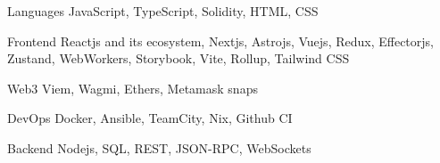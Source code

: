 

\begin{cvskills}

  \cvskill
    {Languages} %
    {JavaScript, TypeScript, Solidity, HTML, CSS} %

  \cvskill
    {Frontend} %
    {Reactjs and its ecosystem, Nextjs, Astrojs, Vuejs, Redux, Effectorjs, Zustand, WebWorkers, Storybook, Vite, Rollup, Tailwind CSS} %

  \cvskill
    {Web3} %
    {Viem, Wagmi, Ethers, Metamask snaps} %

  \cvskill
    {DevOps} %
    {Docker, Ansible, TeamCity, Nix, Github CI} %

  \cvskill
    {Backend} %
    {Nodejs, SQL, REST, JSON-RPC, WebSockets} %

\end{cvskills}
